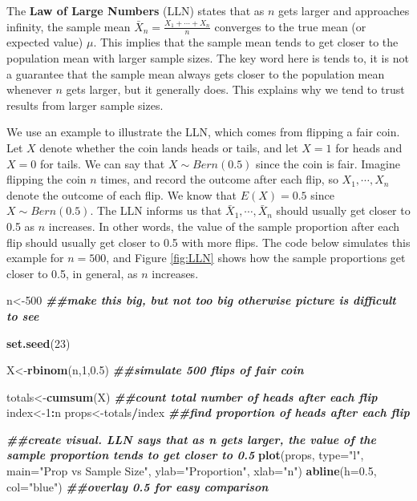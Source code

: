 \documentclass[
]{book}
\newenvironment{Shaded}{\begin{snugshade}}{\end{snugshade}}
\newcommand{\AttributeTok}[1]{\textcolor[rgb]{0.13,0.29,0.53}{#1}}
\newcommand{\DecValTok}[1]{\textcolor[rgb]{0.00,0.00,0.81}{#1}}
\newcommand{\DocumentationTok}[1]{\textcolor[rgb]{0.56,0.35,0.01}{\textbf{\textit{#1}}}}
\newcommand{\FloatTok}[1]{\textcolor[rgb]{0.00,0.00,0.81}{#1}}
\newcommand{\FunctionTok}[1]{\textcolor[rgb]{0.13,0.29,0.53}{\textbf{#1}}}
\newcommand{\NormalTok}[1]{#1}
\newcommand{\OtherTok}[1]{\textcolor[rgb]{0.56,0.35,0.01}{#1}}
\newcommand{\SpecialCharTok}[1]{\textcolor[rgb]{0.81,0.36,0.00}{\textbf{#1}}}
\newcommand{\StringTok}[1]{\textcolor[rgb]{0.31,0.60,0.02}{#1}}
\theoremstyle{definition}
\theoremstyle{definition}
\theoremstyle{definition}
\theoremstyle{definition}
\theoremstyle{remark}
\begin{document}
The \textbf{Law of Large Numbers} (LLN) states that as \(n\) gets larger and approaches infinity, the sample mean \(\bar{X}_n = \frac{X_1 + \cdots + X_n}{n}\) converges to the true mean (or expected value) \(\mu\). This implies that the sample mean tends to get closer to the population mean with larger sample sizes. The key word here is tends to, it is not a guarantee that the sample mean always gets closer to the population mean whenever \(n\) gets larger, but it generally does. This explains why we tend to trust results from larger sample sizes.

We use an example to illustrate the LLN, which comes from flipping a fair coin. Let \(X\) denote whether the coin lands heads or tails, and let \(X=1\) for heads and \(X=0\) for tails. We can say that \(X \sim Bern(0.5)\) since the coin is fair. Imagine flipping the coin \(n\) times, and record the outcome after each flip, so \(X_1, \cdots, X_n\) denote the outcome of each flip. We know that \(E(X) = 0.5\) since \(X \sim Bern(0.5)\). The LLN informs us that \(\bar{X}_1, \cdots, \bar{X}_n\) should usually get closer to 0.5 as \(n\) increases. In other words, the value of the sample proportion after each flip should usually get closer to 0.5 with more flips. The code below simulates this example for \(n=500\), and Figure \ref{fig:LLN} shows how the sample proportions get closer to 0.5, in general, as \(n\) increases.

\begin{Shaded}
\begin{Highlighting}[]
\NormalTok{n}\OtherTok{\textless{}{-}}\DecValTok{500} \DocumentationTok{\#\#make this big, but not too big otherwise picture is difficult to see}

\FunctionTok{set.seed}\NormalTok{(}\DecValTok{23}\NormalTok{)}

\NormalTok{X}\OtherTok{\textless{}{-}}\FunctionTok{rbinom}\NormalTok{(n,}\DecValTok{1}\NormalTok{,}\FloatTok{0.5}\NormalTok{) }\DocumentationTok{\#\#simulate 500 flips of fair coin}

\NormalTok{totals}\OtherTok{\textless{}{-}}\FunctionTok{cumsum}\NormalTok{(X) }\DocumentationTok{\#\#count total number of heads after each flip}
\NormalTok{index}\OtherTok{\textless{}{-}}\DecValTok{1}\SpecialCharTok{:}\NormalTok{n}
\NormalTok{props}\OtherTok{\textless{}{-}}\NormalTok{totals}\SpecialCharTok{/}\NormalTok{index }\DocumentationTok{\#\#find proportion of heads after each flip}

\DocumentationTok{\#\#create visual. LLN says that as n gets larger, the value of the sample proportion tends to get closer to 0.5}
\FunctionTok{plot}\NormalTok{(props, }\AttributeTok{type=}\StringTok{"l"}\NormalTok{, }\AttributeTok{main=}\StringTok{"Prop vs Sample Size"}\NormalTok{, }\AttributeTok{ylab=}\StringTok{"Proportion"}\NormalTok{, }\AttributeTok{xlab=}\StringTok{"n"}\NormalTok{)}
\FunctionTok{abline}\NormalTok{(}\AttributeTok{h=}\FloatTok{0.5}\NormalTok{, }\AttributeTok{col=}\StringTok{"blue"}\NormalTok{) }\DocumentationTok{\#\#overlay 0.5 for easy comparison}
\end{Highlighting}
\end{Shaded}
\end{document}
